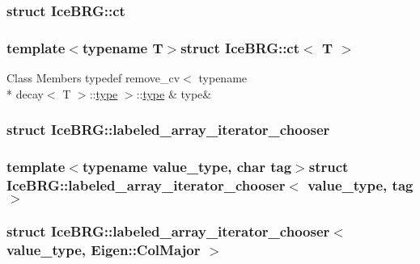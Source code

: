 \subsubsection{struct Ice\+B\+R\+G\+:\+:ct}
\subsubsection*{template$<$typename T$>$struct Ice\+B\+R\+G\+::ct$<$ T $>$}

\begin{DoxyFields}{Class Members}
\hypertarget{namespaceIceBRG_a05329b20d301ee47691fcbf1395fc75d}{}typedef remove\+\_\+cv$<$ typename \\*
decay$<$ T $>$\+::\hyperlink{namespaceIceBRG_a05329b20d301ee47691fcbf1395fc75d}{type} $>$\+::\hyperlink{namespaceIceBRG_a05329b20d301ee47691fcbf1395fc75d}{type}\label{namespaceIceBRG_a05329b20d301ee47691fcbf1395fc75d}
&
type&
\\
\hline

\end{DoxyFields}
\label{structIceBRG_1_1labeled__array__iterator__chooser}
\hypertarget{namespaceIceBRG_structIceBRG_1_1labeled__array__iterator__chooser}{}
\subsubsection{struct Ice\+B\+R\+G\+:\+:labeled\+\_\+array\+\_\+iterator\+\_\+chooser}
\subsubsection*{template$<$typename value\+\_\+type, char tag$>$struct Ice\+B\+R\+G\+::labeled\+\_\+array\+\_\+iterator\+\_\+chooser$<$ value\+\_\+type, tag $>$}

\label{structIceBRG_1_1labeled__array__iterator__chooser_3_01value__type_00_01Eigen_1_1ColMajor_01_4}
\hypertarget{namespaceIceBRG_structIceBRG_1_1labeled__array__iterator__chooser_3_01value__type_00_01Eigen_1_1ColMajor_01_4}{}
\subsubsection{struct Ice\+B\+R\+G\+:\+:labeled\+\_\+array\+\_\+iterator\+\_\+chooser$<$ value\+\_\+type, Eigen\+:\+:Col\+Major $>$}

